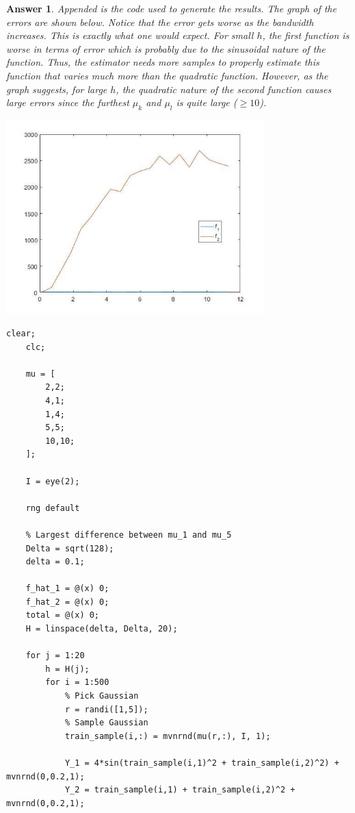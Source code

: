 \documentclass[12pt]{article}
\theoremstyle{colon}
\newtheorem*{answer}{Answer}
\begin{document}
\begin{answer}
  Appended is the code used to generate the results. The graph of the errors are shown below. Notice that the error gets worse as the bandwidth increases. This is exactly what one would expect. For small $h$, the first function is worse in terms of error which is probably due to the sinusoidal nature of the function. Thus, the estimator needs more samples to properly estimate this function that varies much more than the quadratic function. However, as the graph suggests, for large $h$, the quadratic nature of the second function causes large errors since the furthest $\mu_k$ and $\mu_l$ is quite large ($\geq 10$).

  \begin{center}
    \includegraphics[width=10cm]{exercise9}
  \end{center}

  \begin{lstlisting}[style=Matlab-editor, basicstyle=\scriptsize]
    clear;
    clc;

    mu = [
        2,2;
        4,1;
        1,4;
        5,5;
        10,10;
    ];

    I = eye(2);

    rng default

    % Largest difference between mu_1 and mu_5
    Delta = sqrt(128);
    delta = 0.1;

    f_hat_1 = @(x) 0;
    f_hat_2 = @(x) 0;
    total = @(x) 0;
    H = linspace(delta, Delta, 20);

    for j = 1:20
        h = H(j);
        for i = 1:500
            % Pick Gaussian
            r = randi([1,5]);
            % Sample Gaussian
            train_sample(i,:) = mvnrnd(mu(r,:), I, 1);

            Y_1 = 4*sin(train_sample(i,1)^2 + train_sample(i,2)^2) + mvnrnd(0,0.2,1);
            Y_2 = train_sample(i,1) + train_sample(i,2)^2 + mvnrnd(0,0.2,1);


\end{lstlisting}
\end{answer}
\end{document}
